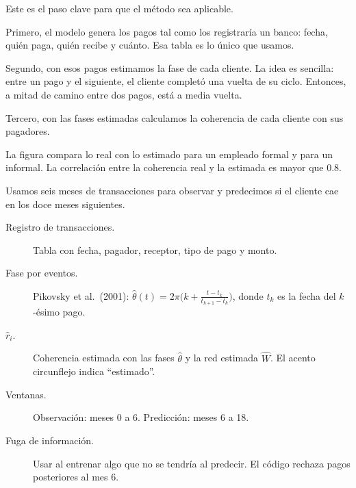 \begin{decir}
Este es el paso clave para que el método sea aplicable.

Primero, el modelo genera los pagos tal como los registraría un banco: fecha, quién paga,
quién recibe y cuánto. Esa tabla es lo único que usamos.

Segundo, con esos pagos estimamos la fase de cada cliente. La idea es sencilla: entre un
pago y el siguiente, el cliente completó una vuelta de su ciclo. Entonces, a mitad de
camino entre dos pagos, está a media vuelta.

Tercero, con las fases estimadas calculamos la coherencia de cada cliente con sus
pagadores.

La figura compara lo real con lo estimado para un empleado formal y para un informal. La
correlación entre la coherencia real y la estimada es mayor que 0.8.

Usamos seis meses de transacciones para observar y predecimos si el cliente cae en los
doce meses siguientes.
\end{decir}
\begin{terminos}
\begin{description}
\item[Registro de transacciones.] Tabla con fecha, pagador, receptor, tipo de pago y
monto.
\item[Fase por eventos.] Pikovsky et al.\ (2001):
$\hat\theta(t)=2\pi\bigl(k+\frac{t-t_k}{t_{k+1}-t_k}\bigr)$, donde $t_k$ es la fecha del
$k$-ésimo pago.
\item[$\hat r_i$.] Coherencia estimada con las fases $\hat\theta$ y la red estimada
$\hat W$. El acento circunflejo indica ``estimado''.
\item[Ventanas.] Observación: meses 0 a 6. Predicción: meses 6 a 18.
\item[Fuga de información.] Usar al entrenar algo que no se tendría al predecir. El código
rechaza pagos posteriores al mes 6.
\end{description}
\end{terminos}


